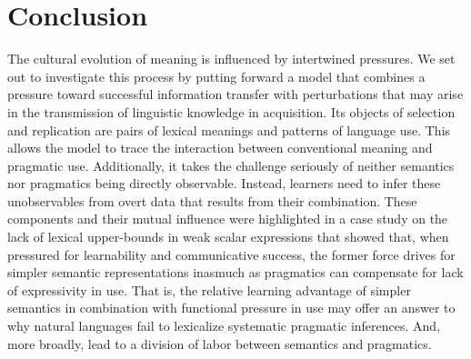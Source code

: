 \documentclass[a4paper, 11pt]{article}
\theoremstyle{Satz}
\begin{document}
\section{Conclusion}
The cultural evolution of meaning is influenced by intertwined pressures. We set out to
investigate this process by putting forward a model that combines a pressure toward successful
information transfer with perturbations that may arise in the transmission of linguistic
knowledge in acquisition. Its objects of selection and replication are pairs of lexical
meanings and patterns of language use. This allows the model to trace the interaction between
conventional meaning and pragmatic use. Additionally, it takes the challenge seriously of
neither semantics nor pragmatics being directly observable. Instead, learners need to infer
these unobservables from overt data that results from their combination.  These components and
their mutual influence were highlighted in a case study on the lack of lexical upper-bounds in
weak scalar expressions that showed that, when pressured for learnability and communicative
success, the former force drives for simpler semantic representations inasmuch as pragmatics
can compensate for lack of expressivity in use. That is, the relative learning advantage of
simpler semantics in combination with functional pressure in use may offer an answer to why
natural languages fail to lexicalize systematic pragmatic inferences. And, more broadly, lead to a
division of labor between semantics and pragmatics.



\end{document}
